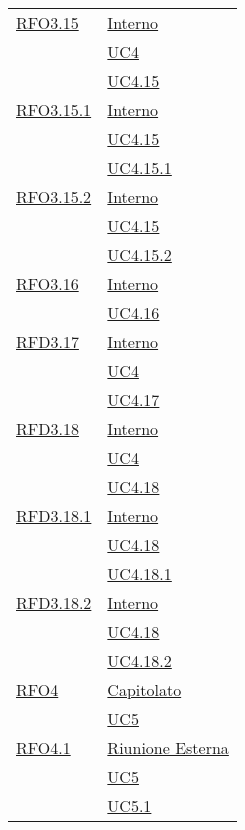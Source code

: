 \begin{longtable}{|>{\centering}m{5cm}|m{5cm}<{\centering}|}
\hyperlink{RFO3.15}{RFO3.15} &   \hyperlink{Interno}{Interno}\\ &\hyperref[UC4]{UC4}\\ &\hyperref[UC4.15]{UC4.15}\\ \hline

\hyperlink{RFO3.15.1}{RFO3.15.1} &   \hyperlink{Interno}{Interno}\\ &\hyperref[UC4.15]{UC4.15}\\ &\hyperref[UC4.15.1]{UC4.15.1}\\ \hline

\hyperlink{RFO3.15.2}{RFO3.15.2} &  \hyperlink{Interno}{Interno}\\ &\hyperref[UC4.15]{UC4.15}\\ &\hyperref[UC4.15.2]{UC4.15.2}\\ \hline

\hyperlink{RFO3.16}{RFO3.16} & \hyperlink{Interno}{Interno}\\ &\hyperref[UC4.16]{UC4.16}\\ \hline

\hyperlink{RFD3.17}{RFD3.17} &   \hyperlink{Interno}{Interno}\\ &\hyperref[UC4]{UC4}\\ &\hyperref[UC4.17]{UC4.17}\\ \hline

\hyperlink{RFD3.18}{RFD3.18} &  \hyperlink{Interno}{Interno}\\ &\hyperref[UC4]{UC4}\\ &\hyperref[UC4.18]{UC4.18}\\ \hline

\hyperlink{RFD3.18.1}{RFD3.18.1} & \hyperlink{Interno}{Interno}\\ &\hyperref[UC4.18]{UC4.18}\\ &\hyperref[UC4.18.1]{UC4.18.1}\\ \hline

\hyperlink{RFD3.18.2}{RFD3.18.2} & \hyperlink{Interno}{Interno}\\ &\hyperref[UC4.18]{UC4.18}\\ &\hyperref[UC4.18.2]{UC4.18.2}\\ \hline

\hyperlink{RFO4}{RFO4} & \hyperlink{Capitolato}{Capitolato}\\  &\hyperref[UC5]{UC5}\\ \hline

\hyperlink{RFO4.1}{RFO4.1} & \hyperlink{Riunione Esterna}{Riunione Esterna}\\ &\hyperref[UC5]{UC5}\\ &\hyperref[UC5.1]{UC5.1}\\ \hline


\end{longtable}
